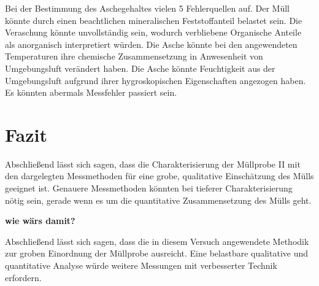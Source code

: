 Bei der Bestimmung des Aschegehaltes vielen 5 Fehlerquellen auf. Der Müll könnte durch einen beachtlichen mineralischen Feststoffanteil belastet sein. Die Veraschung könnte unvollständig sein, wodurch verbliebene Organische Anteile als anorganisch interpretiert würden. Die Asche könnte bei den angewendeten Temperaturen ihre chemische Zusammensetzung in Anwesenheit von Umgebungsluft verändert haben. Die Asche könnte Feuchtigkeit aus der Umgebungsluft aufgrund ihrer hygroskopischen Eigenschaften angezogen haben. Es könnten abermals Messfehler passiert sein. 

\chapter{Fazit}
Abschließend lässt sich sagen, dass die Charakterisierung der Müllprobe II mit den dargelegten Messmethoden für eine grobe, qualitative Einschätzung des Mülls geeignet ist. Genauere Messmethoden könnten bei tieferer Charakterisierung nötig sein, gerade wenn es um die quantitative Zusammensetzung des Mülls geht.

\textbf{wie wärs damit?}

Abschließend lässt sich sagen, dass die in diesem Versuch angewendete Methodik zur groben Einordnung der Müllprobe ausreicht. Eine belastbare qualitative und quantitative Analyse würde weitere Messungen mit verbesserter Technik erfordern.